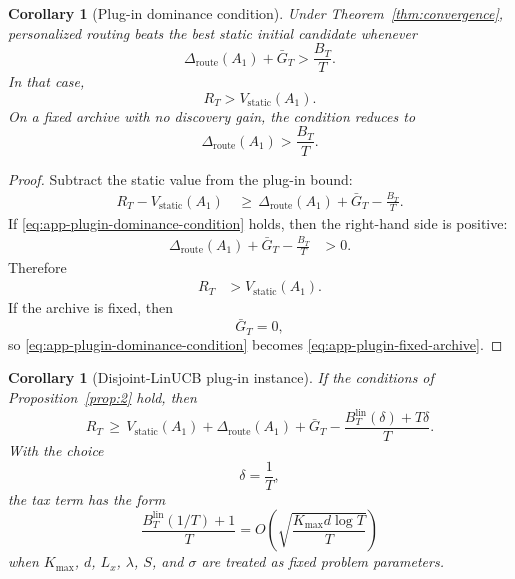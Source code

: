 \documentclass{article} %
\newtheorem{corollary}[theorem]{Corollary}
\begin{document}
\begin{corollary}[Plug-in dominance condition]
\label{cor:app-plugin-dominance}
Under Theorem~\ref{thm:convergence}, personalized routing beats the best static initial candidate whenever
\begin{equation}
\label{eq:app-plugin-dominance-condition}
\Delta_{\mathrm{route}}(A_1)
+
\bar G_T
>
\frac{B_T}{T}.
\end{equation}
In that case,
\begin{equation}
\label{eq:app-plugin-dominance-result}
R_T
>
V_{\mathrm{static}}(A_1).
\end{equation}
On a fixed archive with no discovery gain, the condition reduces to
\begin{equation}
\label{eq:app-plugin-fixed-archive}
\Delta_{\mathrm{route}}(A_1)
>
\frac{B_T}{T}.
\end{equation}
\end{corollary}

\begin{proof}
Subtract the static value from the plug-in bound:
\begin{align}
\label{eq:app-plugin-dominance-proof}
R_T
-
V_{\mathrm{static}}(A_1)
&\,\ge\,
\Delta_{\mathrm{route}}(A_1)
+
\bar G_T
-
\frac{B_T}{T}.
\end{align}
If \eqref{eq:app-plugin-dominance-condition} holds, then the right-hand side is positive:
\begin{align}
\label{eq:app-plugin-dominance-proof-positive}
\Delta_{\mathrm{route}}(A_1)
+
\bar G_T
-
\frac{B_T}{T}
&>
0.
\end{align}
Therefore
\begin{align}
\label{eq:app-plugin-dominance-proof-final}
R_T
&>
V_{\mathrm{static}}(A_1).
\end{align}
If the archive is fixed, then
\begin{equation}
\label{eq:app-plugin-no-discovery}
\bar G_T=0,
\end{equation}
so \eqref{eq:app-plugin-dominance-condition} becomes \eqref{eq:app-plugin-fixed-archive}.
\end{proof}

\begin{corollary}[Disjoint-LinUCB plug-in instance]
\label{cor:app-linucb-plugin}
If the conditions of Proposition~\ref{prop:2} hold, then
\begin{equation}
\label{eq:app-linucb-plugin-bound}
R_T
\,\ge\,
V_{\mathrm{static}}(A_1)
+
\Delta_{\mathrm{route}}(A_1)
+
\bar G_T
-
\frac{B_T^{\mathrm{lin}}(\delta)+T\delta}{T}.
\end{equation}
With the choice
\begin{equation}
\label{eq:app-linucb-delta-choice}
\delta
=
\frac{1}{T},
\end{equation}
the tax term has the form
\begin{equation}
\label{eq:app-linucb-rate-form}
\frac{B_T^{\mathrm{lin}}(1/T)+1}{T}
=
O\!\left(
\sqrt{
\frac{K_{\max}d\log T}{T}
}
\right)
\end{equation}
when \(K_{\max}\), \(d\), \(L_x\), \(\lambda\), \(S\), and \(\sigma\) are treated as fixed problem parameters.
\end{corollary}
\end{document}

